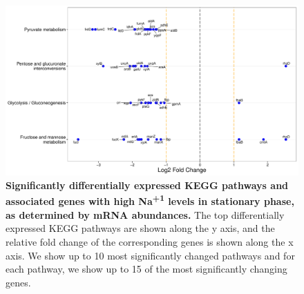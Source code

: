 \documentclass[a4paper]{article}
\begin{document}
\clearpage
\begin{figure}
	\includegraphics[width=1.0\textwidth]{../../d_figures/kegg_15.pdf}
	\caption[Significantly altered KEGG pathways for mRNA samples in stationary phase tested for high Na\textsuperscript{+1} against base Na\textsuperscript{+1}]
	{\textbf{Significantly differentially expressed KEGG pathways and associated genes with high Na\textsuperscript{+1} levels in stationary phase, as determined by mRNA abundances.} The top differentially expressed KEGG pathways are shown along the y axis, and the relative fold change of the corresponding genes is shown along the x axis. We show up to 10 most significantly changed pathways and for each pathway, we show up to 15 of the most significantly changing genes.}
\end{figure}
\end{document}
